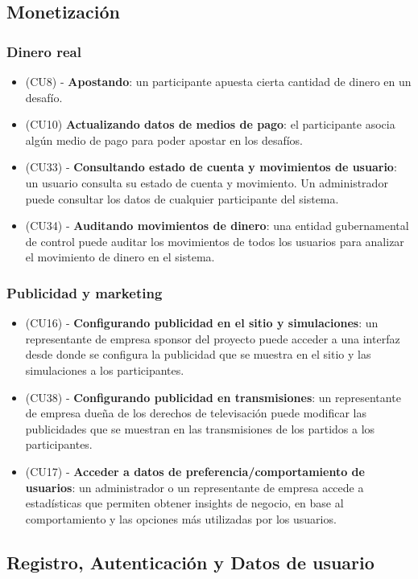 \subsection{Monetización}
\subsubsection{Dinero real}
\begin{itemize}
\item (CU8) - \textbf{Apostando}: un participante apuesta cierta cantidad de dinero en un desafío.
\item (CU10) \textbf{Actualizando datos de medios de pago}: el participante asocia algún medio de pago para poder apostar en los desafíos.
\item (CU33) - \textbf{Consultando estado de cuenta y movimientos de usuario}: un usuario consulta su estado de cuenta y movimiento. Un administrador puede consultar los datos de cualquier participante del sistema.
\item (CU34) - \textbf{Auditando movimientos de dinero}: una entidad gubernamental de control puede auditar los movimientos de todos los usuarios para analizar el movimiento de dinero en el sistema.
\end{itemize}

\subsubsection{Publicidad y marketing}
\begin{itemize}
\item (CU16) - \textbf{Configurando publicidad en el sitio y simulaciones}: un representante de empresa sponsor del proyecto puede acceder a una interfaz desde donde se configura la publicidad que se muestra en el sitio y las simulaciones a los participantes.
\item (CU38) - \textbf{Configurando publicidad en transmisiones}: un representante de empresa dueña de los derechos de televisación puede modificar las publicidades que se muestran en las transmisiones de los partidos a los participantes.
\item (CU17) - \textbf{Acceder a datos de preferencia/comportamiento de usuarios}: un administrador o un representante de empresa accede a estadísticas que permiten obtener insights de negocio, en base al comportamiento y las opciones más utilizadas por los usuarios.
\end{itemize}

\subsection{Registro, Autenticación y Datos de usuario}

